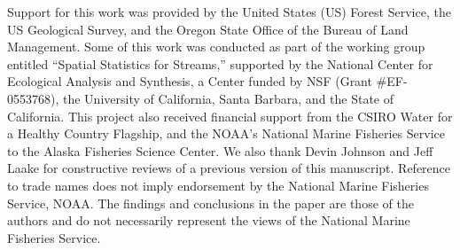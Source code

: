 \documentclass[nojss]{jss}
\begin{document}
Support for this work was provided by the United States (US) Forest
Service, the US Geological Survey, and the Oregon State Office of the
Bureau of Land Management. Some of this work was conducted as part of
the working group entitled ``Spatial Statistics for Streams,'' supported by the National Center for Ecological Analysis
and Synthesis, a Center funded by NSF (Grant \#EF-0553768), the
University of California, Santa Barbara, and the State of
California. This project also received financial support from the
CSIRO Water for a Healthy Country Flagship, and the NOAA's National
Marine Fisheries Service to the Alaska Fisheries Science Center. We
also thank Devin Johnson and Jeff Laake for constructive reviews of a
previous version of this manuscript. Reference to trade names does not
imply endorsement by the National Marine Fisheries Service, NOAA. The
findings and conclusions in the paper are those of the authors and do
not necessarily represent the views of the National Marine Fisheries
Service.


%
%


\end{document}
